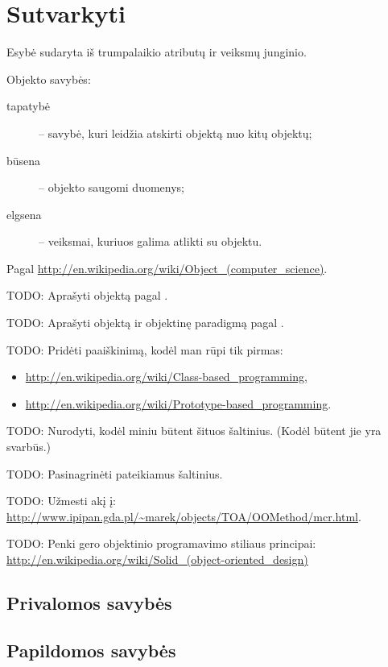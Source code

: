 \section{Sutvarkyti}

\begin{defn}[Objektas]
  Esybė sudaryta iš trumpalaikio atributų ir veiksmų junginio.

  Objekto savybės:
  \begin{description}
    \item[tapatybė] – savybė, kuri leidžia atskirti objektą nuo kitų
      objektų;
    \item[būsena] – objekto saugomi duomenys;
    \item[elgsena] – veiksmai, kuriuos galima atlikti su objektu.
  \end{description}

  Pagal \url{http://en.wikipedia.org/wiki/Object_(computer_science)}.

  TODO: Aprašyti objektą pagal \cite[38]{Booch:2007:OAD:1407387}.

  TODO: Aprašyti objektą ir objektinę paradigmą pagal
  \cite[37]{cs-beyond-object-oriented-programming}.

\end{defn}

TODO: Pridėti paaiškinimą, kodėl man rūpi tik pirmas:
\begin{itemize}
  \item \url{http://en.wikipedia.org/wiki/Class-based_programming},
  \item \url{http://en.wikipedia.org/wiki/Prototype-based_programming}.
\end{itemize}

TODO: Nurodyti, kodėl miniu būtent šituos šaltinius. (Kodėl būtent jie
yra svarbūs.)

TODO: Pasinagrinėti \cite[38]{Booch:2007:OAD:1407387} pateikiamus
šaltinius.

TODO: Užmesti akį į:
\url{http://www.ipipan.gda.pl/~marek/objects/TOA/OOMethod/mcr.html}.

TODO: Penki gero objektinio programavimo stiliaus principai:
\url{http://en.wikipedia.org/wiki/Solid_(object-oriented_design)}

\subsection{Privalomos savybės}
\subsection{Papildomos savybės}

